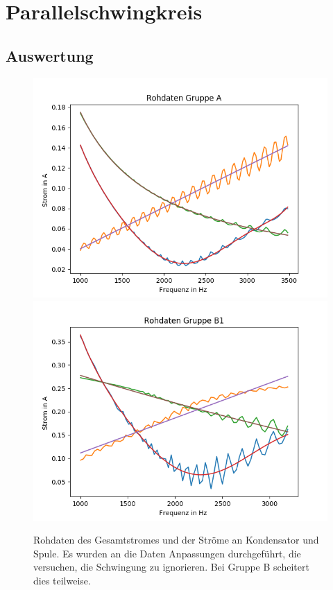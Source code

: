 \documentclass[12pt,a4paper]{article}
\begin{document}
\section{Parallelschwingkreis}

\subsection{Auswertung}
\begin{figure}
\centering
\includegraphics[scale=1]{Bilder/Parallel_Rohdaten.png}
\includegraphics[scale=1]{Bilder/Parallel_RohdatenB.png}
\caption{Rohdaten des Gesamtstromes und der Ströme an Kondensator und Spule. Es wurden an die Daten Anpassungen durchgeführt, die versuchen, die Schwingung zu ignorieren. Bei Gruppe B scheitert dies teilweise.}
\label{fig:parallel_Rohdaten}
\end{figure}
\end{document}
